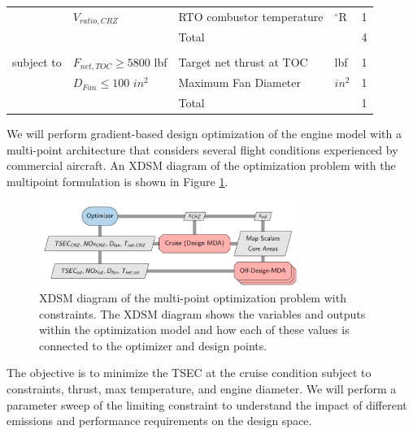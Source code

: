 \documentclass[conf]{new-aiaa}
\begin{document}
\begin{table}[h]
\begin{tabular}{r l l l l}
                        & $V_{ratio,CRZ}$             & RTO combustor temperature                   & $^\circ$R       & 1        \\
        \cline{3-5}
                        &                             & Total                                       &                 & 4        \\
                        &                             &                                             &                 &          \\
        subject to      & $F_{net,TOC} \geq 5800$ lbf & Target net thrust at TOC                    & lbf             & 1        \\
                        & $D_{Fan} \leq 100$ $in^2$   & Maximum Fan Diameter                        & $in^2$          & 1        \\
        \cline{3-5}
                        &                             & Total                                       &                 & 1        \\
        \bottomrule
    \end{tabular}
    \label{tab:opt_problem}
\end{table}


We will perform gradient-based design optimization of the engine model with a multi-point architecture that considers several flight conditions experienced by commercial aircraft.
An XDSM diagram of the optimization problem with the multipoint formulation is shown in Figure \ref{fig:opt_prob}.

\begin{figure}[hbt!]
    \centering
    \includegraphics[width=0.75\textwidth]{N3_inject.pdf}
    \caption{XDSM diagram of the multi-point optimization problem with constraints.
        The XDSM diagram shows the variables and outputs within the optimization model and how each of these values is connected to the optimizer and design points.}
    \label{fig:opt_prob}
\end{figure}

The objective is to minimize the TSEC at the cruise condition subject to constraints, thrust, max temperature, and engine diameter.
We will perform a parameter sweep of the limiting constraint to understand the impact of different emissions and performance requirements on the design space.
\end{document}
